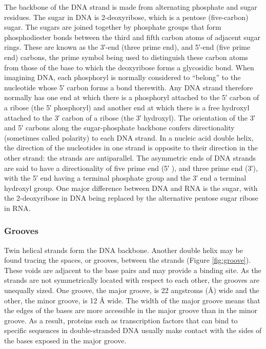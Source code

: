 The backbone of the DNA strand is made from alternating phosphate and sugar residues. The sugar in DNA is 2-deoxyribose, which is a pentose (five-carbon) sugar. The sugars are joined together by phosphate groups that form phosphodiester bonds between the third and fifth carbon atoms of adjacent sugar rings. These are known as the 3′-end (three prime end), and 5′-end (five prime end) carbons, the prime symbol being used to distinguish these carbon atoms from those of the base to which the deoxyribose forms a glycosidic bond. When imagining DNA, each phosphoryl is normally considered to ``belong'' to the nucleotide whose 5′ carbon forms a bond therewith. Any DNA strand therefore normally has one end at which there is a phosphoryl attached to the 5′ carbon of a ribose (the 5′ phosphoryl) and another end at which there is a free hydroxyl attached to the 3′ carbon of a ribose (the 3′ hydroxyl). The orientation of the 3′ and 5′ carbons along the sugar-phosphate backbone confers directionality (sometimes called polarity) to each DNA strand. In a nucleic acid double helix, the direction of the nucleotides in one strand is opposite to their direction in the other strand: the strands are antiparallel. The asymmetric ends of DNA strands are said to have a directionality of five prime end (5′ ), and three prime end (3′), with the 5′ end having a terminal phosphate group and the 3′ end a terminal hydroxyl group. One major difference between DNA and RNA is the sugar, with the 2-deoxyribose in DNA being replaced by the alternative pentose sugar ribose in RNA.

\hypertarget{grooves}{%
\subsubsection{Grooves}\label{grooves}}

Twin helical strands form the DNA backbone. Another double helix may be found tracing the spaces, or grooves, between the strands (Figure \ref{fig:groove}). These voids are adjacent to the base pairs and may provide a binding site. As the strands are not symmetrically located with respect to each other, the grooves are unequally sized. One groove, the major groove, is 22 angstroms (Å) wide and the other, the minor groove, is 12 Å wide. The width of the major groove means that the edges of the bases are more accessible in the major groove than in the minor groove. As a result, proteins such as transcription factors that can bind to specific sequences in double-stranded DNA usually make contact with the sides of the bases exposed in the major groove.



